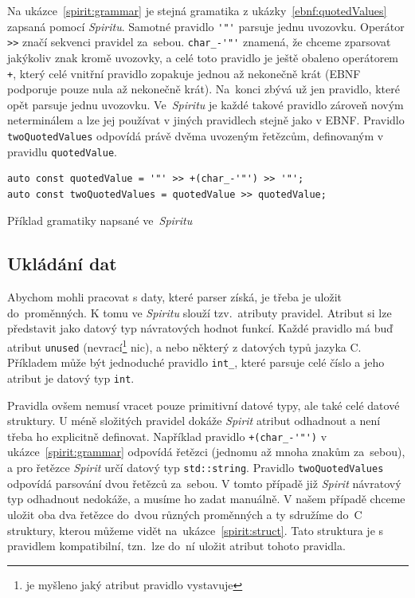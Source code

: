 \documentclass[thesis=B,czech,hidelinks]{FITthesis}[2019/03/06]
\newcommand{\Rplus}{\protect\hspace{-.1em}\protect\raisebox{.35ex}{\smaller{\smaller\textbf{+}}}}
\newcommand{\Cpp}{\mbox{C\Rplus\Rplus}\xspace}
\begin{document}
Na ukázce~\ref{spirit:grammar} je stejná gramatika z ukázky~\ref{ebnf:quotedValues} zapsaná pomocí \textit{Spiritu}. Samotné pravidlo \verb¨'"'¨ parsuje jednu uvozovku. Operátor \verb¨>>¨ značí sekvenci pravidel za~sebou. \verb¨char_-'"'¨ znamená, že chceme zparsovat jakýkoliv znak kromě uvozovky, a celé toto pravidlo je ještě obaleno operátorem \verb¨+¨, který celé vnitřní pravidlo zopakuje jednou až nekonečně krát (EBNF podporuje pouze nula až nekonečně krát). Na~konci zbývá už jen pravidlo, které opět parsuje jednu uvozovku. Ve~\textit{Spiritu} je každé takové pravidlo zároveň novým neterminálem a lze jej používat v jiných pravidlech stejně jako v EBNF\@. Pravidlo \texttt{twoQuotedValues} odpovídá právě dvěma uvozeným řetězcům, definovaným v pravidlu \texttt{quotedValue}.

\begin{listing}[H]
\begin{verbatim}
auto const quotedValue = '"' >> +(char_-'"') >> '"';
auto const twoQuotedValues = quotedValue >> quotedValue;
\end{verbatim}
\caption{Příklad gramatiky napsané ve~\textit{Spiritu}}\label{spirit:grammar}
\end{listing}


\subsection{Ukládání dat}
Abychom mohli pracovat s daty, které parser získá, je třeba je uložit do~proměnných. K tomu ve \textit{Spiritu} slouží tzv.\ atributy pravidel. Atribut si lze představit jako datový typ návratových hodnot funkcí. Každé pravidlo má buď atribut \texttt{unused} (nevrací\footnote{ je myšleno jaký atribut pravidlo vystavuje} nic), a nebo některý z datových typů jazyka \Cpp{}. Příkladem může být jednoduché pravidlo \verb¨int_¨, které parsuje celé číslo a jeho atribut je datový typ \texttt{int}.

Pravidla ovšem nemusí vracet pouze primitivní datové typy, ale také celé datové struktury. U méně složitých pravidel dokáže \textit{Spirit} atribut odhadnout a není třeba ho explicitně definovat. Například pravidlo \verb¨+(char_-'"')¨ v ukázce~\ref{spirit:grammar} odpovídá řetězci (jednomu až mnoha znakům za~sebou), a pro řetězce \textit{Spirit} určí datový typ \texttt{std::string}. Pravidlo \texttt{twoQuotedValues} odpovídá parsování dvou řetězců za~sebou. V tomto případě již \textit{Spirit} návratový typ odhadnout nedokáže, a musíme ho zadat manuálně. V našem případě chceme uložit oba dva řetězce do~dvou různých proměnných a ty sdružíme do~\Cpp{} struktury, kterou můžeme vidět na~ukázce~\ref{spirit:struct}. Tato struktura je s pravidlem kompatibilní, tzn.\ lze do~ní uložit atribut tohoto pravidla.
\end{document}
